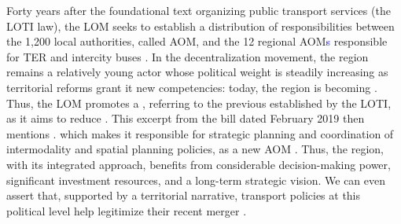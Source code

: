 \begin{refsegment}
{    Forty years after the foundational text organizing public transport services (the \acrshort{LOTI} law), the \acrfull{LOM} seeks to establish a distribution of responsibilities between the 1,200 local authorities, called \acrfull{AOM}, and the 12 regional \acrshort{AOM}\textcolor{blue}{s} responsible for \acrshort{TER} and intercity buses \textcolor{blue}{\autocite[29]{richer_quoi_2024}}. In the decentralization movement, the region remains a relatively young actor whose political weight is steadily increasing as territorial reforms grant it new competencies: today, the region is becoming  \textcolor{blue}{\autocite[34]{richer_quoi_2024}}. Thus, the \acrshort{LOM} promotes a , referring to the previous  established by the \acrshort{LOTI}, as it aims to reduce  \textcolor{blue}{\autocite[283]{izembard_loi_2020}}. This excerpt from the bill dated February 2019 then mentions  \textcolor{blue}{\autocite[2]{ministere_de_la_transition_ecologique_et_solidaire_orientation_2023}}.
} which makes it responsible for strategic planning and coordination of intermodality and spatial planning policies, as a new \acrfull{AOM}  \textcolor{blue}{\autocites{barone_transports_2020}[174]{sajous_systeme_2020}}. Thus, the region, with its integrated approach, benefits from considerable decision-making power, significant investment resources, and a long-term strategic vision. We can even assert that, supported by a territorial narrative, transport policies at this political level help legitimize their recent merger \textcolor{blue}{\autocite[260, 575-577]{revelli_transports_2019}}.%


\end{refsegment}
